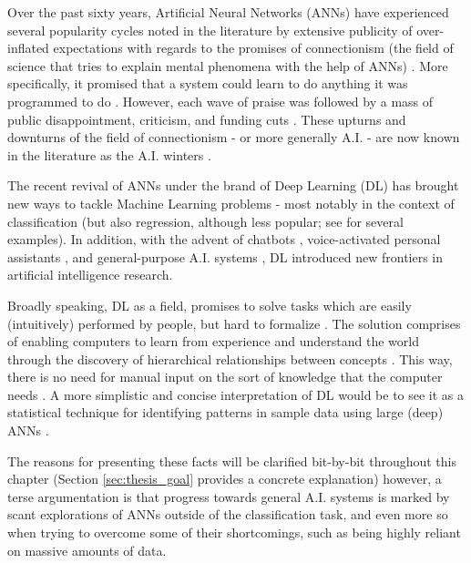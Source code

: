 \documentclass[a4paper]{book}
\begin{document}
Over the past sixty years, Artificial Neural Networks (ANNs) have experienced several popularity cycles noted in the literature by extensive publicity of over-inflated expectations with regards to the promises of connectionism (the field of science that tries to explain mental phenomena with the help of ANNs) \parencite{minsky_perceptrons_1988, knight_ai_2016, nilsson_speed_2009}. More specifically, it promised that a system could learn to do anything it was programmed to do \parencite{minsky_perceptrons_1988}. However, each wave of praise was followed by a mass of public disappointment, criticism, and funding cuts \parencite[e.g.,][]{lighthill_artificial_1972}. These upturns and downturns of the field of connectionism - or more generally A.I. - are now known in the literature as the A.I. winters \parencite{nilsson_speed_2009}.

The recent revival of ANNs under the brand of Deep Learning (DL) has brought new ways to tackle Machine Learning problems - most notably in the context of classification (but also regression, although less popular; see \cite{lecun_deep_2015} for several examples). In addition, with the advent of chatbots \parencite{dale_return_2016}, voice-activated personal assistants \parencite{xiong_microsoft_2018}, and general-purpose A.I. systems \parencite{vinyals_starcraft_2017}, DL introduced new frontiers in artificial intelligence research.

Broadly speaking, DL as a field, promises to solve tasks which are easily (intuitively) performed by people, but hard to formalize \parencite[e.g., recognizing faces or spoken word;][]{goodfellow_deep_2016}. The solution comprises of enabling computers to learn from experience and understand the world through the discovery of hierarchical relationships between concepts \parencite{lecun_deep_2015}. This way, there is no need for manual input on the sort of knowledge that the computer needs \parencite{goodfellow_deep_2016}. A more simplistic and concise interpretation of DL would be to see it as a statistical technique for identifying patterns in sample data using large (deep) ANNs \parencite{marcus_deep_2018}.

The reasons for presenting these facts will be clarified bit-by-bit throughout this chapter (Section \ref{sec:thesis_goal} provides a concrete explanation) however, a terse argumentation is that progress towards general A.I. systems is marked by scant explorations of ANNs outside of the classification task, and even more so when trying to overcome some of their shortcomings, such as being highly reliant on massive amounts of data.
\end{document}
